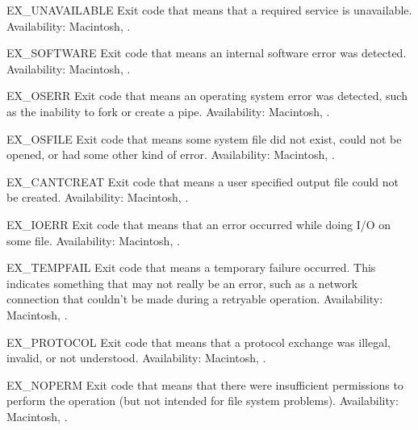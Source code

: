 \begin{datadesc}{EX_UNAVAILABLE}
Exit code that means that a required service is unavailable.
Availability: Macintosh, \UNIX.
\end{datadesc}

\begin{datadesc}{EX_SOFTWARE}
Exit code that means an internal software error was detected.
Availability: Macintosh, \UNIX.
\end{datadesc}

\begin{datadesc}{EX_OSERR}
Exit code that means an operating system error was detected, such as
the inability to fork or create a pipe.
Availability: Macintosh, \UNIX.
\end{datadesc}

\begin{datadesc}{EX_OSFILE}
Exit code that means some system file did not exist, could not be
opened, or had some other kind of error.
Availability: Macintosh, \UNIX.
\end{datadesc}

\begin{datadesc}{EX_CANTCREAT}
Exit code that means a user specified output file could not be created.
Availability: Macintosh, \UNIX.
\end{datadesc}

\begin{datadesc}{EX_IOERR}
Exit code that means that an error occurred while doing I/O on some file.
Availability: Macintosh, \UNIX.
\end{datadesc}

\begin{datadesc}{EX_TEMPFAIL}
Exit code that means a temporary failure occurred.  This indicates
something that may not really be an error, such as a network
connection that couldn't be made during a retryable operation.
Availability: Macintosh, \UNIX.
\end{datadesc}

\begin{datadesc}{EX_PROTOCOL}
Exit code that means that a protocol exchange was illegal, invalid, or
not understood.
Availability: Macintosh, \UNIX.
\end{datadesc}

\begin{datadesc}{EX_NOPERM}
Exit code that means that there were insufficient permissions to
perform the operation (but not intended for file system problems).
Availability: Macintosh, \UNIX.
\end{datadesc}


